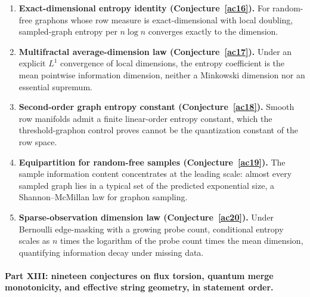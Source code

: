 \documentclass[11pt]{article}
\theoremstyle{definition}
\begin{document}
\begin{enumerate}
\item \textbf{Exact-dimensional entropy identity (Conjecture~\ref{ac16}).}  For random-free graphons whose row measure is exact-dimensional with local doubling, sampled-graph entropy per $n\log n$ converges exactly to the dimension.
\item \textbf{Multifractal average-dimension law (Conjecture~\ref{ac17}).}  Under an explicit $L^1$ convergence of local dimensions, the entropy coefficient is the mean pointwise information dimension, neither a Minkowski dimension nor an essential supremum.
\item \textbf{Second-order graph entropy constant (Conjecture~\ref{ac18}).}  Smooth row manifolds admit a finite linear-order entropy constant, which the threshold-graphon control proves cannot be the quantization constant of the row space.
\item \textbf{Equipartition for random-free samples (Conjecture~\ref{ac19}).}  The sample information content concentrates at the leading scale: almost every sampled graph lies in a typical set of the predicted exponential size, a Shannon--McMillan law for graphon sampling.
\item \textbf{Sparse-observation dimension law (Conjecture~\ref{ac20}).}  Under Bernoulli edge-masking with a growing probe count, conditional entropy scales as $n$ times the logarithm of the probe count times the mean dimension, quantifying information decay under missing data.
\end{enumerate}

\paragraph{Part XIII: nineteen conjectures on flux torsion, quantum merge monotonicity, and effective string geometry, in statement order.}
\end{document}

